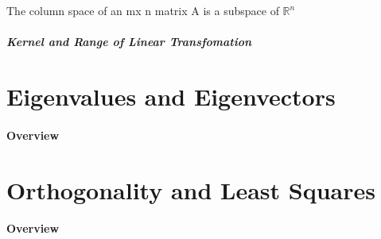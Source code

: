 \documentclass{article}
\begin{document}
\begin{theorem}
    The column space of an mx n matrix A is a subspace of $\mathbb{R}^n$
\end{theorem}

\subsubsection{Kernel and Range of Linear Transfomation}


\begin{definition}
\end{definition}

\begin{theorem}[]
\end{theorem}
\begin{theorem}[]
\end{theorem}
\begin{theorem}[]
\end{theorem}

\begin{definition}
\end{definition}
\begin{definition}
\end{definition}

\part{Eigenvalues and Eigenvectors}
\subsection{Overview}
\part{Orthogonality and Least Squares}
\subsection{Overview}
\end{document}
